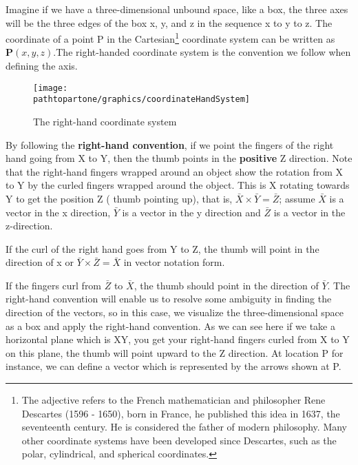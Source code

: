 Imagine if we have a three-dimensional unbound space, like a box, the three axes will be the three edges of the box x, y, and z in the sequence x to y to z. The coordinate of a point P in the {Cartesian}\footnote{
The adjective \textacutedbl refers to the French mathematician and philosopher Rene Descartes (1596 - 1650), born in France, he published this idea in 1637, the seventeenth century. He is considered the father of modern philosophy. Many other coordinate systems have been developed since Descartes, such as the polar, cylindrical, and spherical coordinates.
} coordinate system can be written as $\boldsymbol{P}(x, y, z)$.The right-handed coordinate system is the convention we follow when defining the axis.
\begin{figure}[h]
\centering
\texttt{[image: \\pathtopartone/graphics/coordinateHandSystem]}
\caption{The right-hand coordinate system}
\end{figure}

By following the \textbf{right-hand convention}, if we point the fingers of the right hand going from X to Y, then the thumb points in the \textbf{positive} Z direction. Note that the right-hand fingers wrapped around an object show the rotation from X to Y by the curled fingers wrapped around the object. This is X rotating towards Y to get the position Z ( thumb pointing up), that is, $\bar{X} \times \bar{Y} = \bar{Z}$; assume  $\bar{X}$ is a vector in the x direction, $\bar{Y}$ is a vector in the y direction and $\bar{Z}$ is a vector in the z-direction.

If the curl of the right hand goes from Y to Z, the thumb will point in the direction of x or $\bar{Y} \times \bar{Z} = \bar{X}$ in vector notation form.

If the fingers curl from $\bar{Z}$ to $\bar{X}$, the thumb should point in the direction of $\bar{Y}$. The right-hand convention will enable us to resolve some ambiguity in finding the direction of the vectors, so in this case, we visualize the three-dimensional space as a box and apply the right-hand convention. As we can see here if we take a horizontal plane which is XY, you get your right-hand fingers curled from X to Y on this plane, the thumb will point upward to the Z direction. At location P for instance, we can define a vector which is represented by the arrows shown at P.

